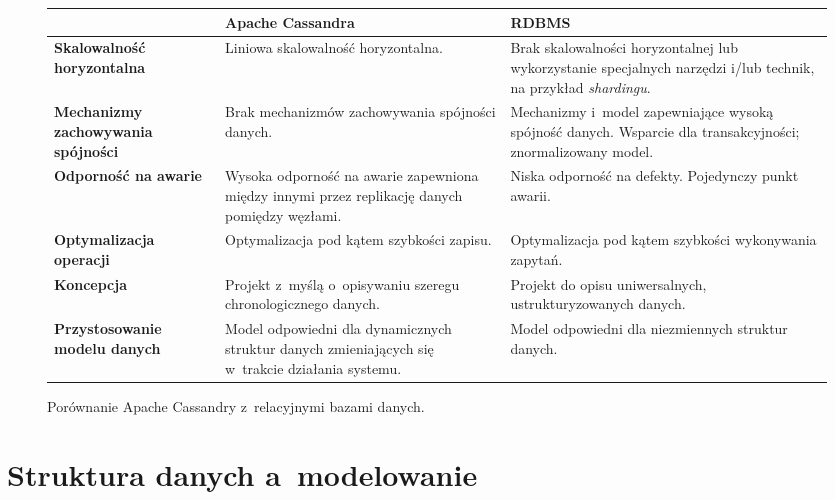 \begin{figure}[ht!]
	\centering

	\begin{tabular}{|p{3cm}|p{4.5cm}|p{4.5cm}|}
		\hline
		& {\small \textbf{Apache Cassandra}} & {\small \textbf{RDBMS}} \\
		\hline
		{\small \textbf{Skalowalność horyzontalna}} &
		Liniowa skalowalność horyzontalna. &
		Brak skalowalności horyzontalnej lub wykorzystanie specjalnych narzędzi i/lub technik, na przykład \emph{shardingu}\footnotemark{}. \\
		\hline
		{\small \textbf{Mechanizmy zachowywania spójności}} &
		Brak mechanizmów zachowywania spójności danych. &
		Mechanizmy i~model zapewniające wysoką spójność danych. Wsparcie dla transakcyjności; znormalizowany model. \\
		\hline
		{\small \textbf{Odporność na awarie}} &
		Wysoka odporność na awarie zapewniona między innymi przez replikację danych pomiędzy węzłami. &
		Niska odporność na defekty. Pojedynczy punkt awarii. \\
		\hline
		{\small \textbf{Optymalizacja operacji}} &
		Optymalizacja pod kątem szybkości zapisu. &
		Optymalizacja pod kątem szybkości wykonywania zapytań. \\
		\hline
		{\small \textbf{Koncepcja}} &
		Projekt z~myślą o~opisywaniu szeregu chronologicznego danych.~\cite{why_should_i_use_cassandra} &
		Projekt do opisu uniwersalnych, ustrukturyzowanych danych. \\
		\hline
		{\small \textbf{Przystosowanie modelu danych}} &
		Model odpowiedni dla dynamicznych struktur danych zmieniających się w~trakcie działania systemu.~\cite{consider_cassandra} &
		Model odpowiedni dla niezmiennych struktur danych. \\
		\hline
	\end{tabular}

	\caption{Porównanie Apache Cassandry z~relacyjnymi bazami danych.}
	\label{tab:cassanda_relationship_database_comparison}
\end{figure}


\section{Struktura danych a~modelowanie}
\label{sec:relative_vs_cassandra_model}


